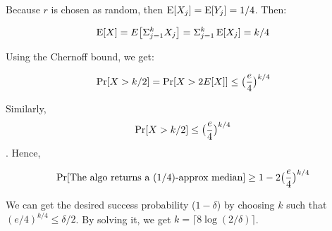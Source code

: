 Because $r$ is chosen as random, then $\operatorname{E}[X_j] = \operatorname{E}[Y_j] = 1/4$. Then:

$$\operatorname{E}[X] = E\big[ \Sigma_{j=1}^k X_j\big] = 
\Sigma_{j=1}^k \operatorname{E}[X_j] = k/4$$

Using the Chernoff bound, we get: 

$$\Pr[X > k/2] = \Pr[X > 2E[X]] \leq \big(\frac{e}{4}\big)^{k/4}$$

Similarly, $$\Pr[X > k/2] \leq \big(\frac{e}{4}\big)^{k/4}$$. Hence, 

$$\Pr[\text{The algo returns a (1/4)-approx median}] \geq 1 - 2\big(\frac{e}{4}\big)^{k/4}$$

We can get the desired success probability ($1 - \delta$) by choosing $k$ such that $(e/4) ^ {k/4} \leq \delta / 2$. By solving it, we get $k = \lceil 8\log (2/\delta) \rceil$.
